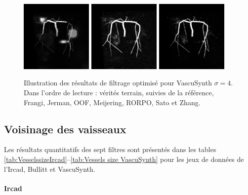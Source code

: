 \begin{figure}[!ht]
  \\
  \includegraphics[clip = true, trim = 80 80 80 80, height=3.5cm]{Images/Vascu_4_RORPO.png}
  \includegraphics[clip = true, trim = 80 80 80 80, height=3.5cm]{Images/Vascu_4_Sato.png}
  \includegraphics[clip = true, trim = 80 80 80 80, height=3.5cm]{Images/Vascu_4_Zhang.png}

  \caption{Illustration des résultats de filtrage optimisé pour VascuSynth $\sigma=4$.
  Dans l'ordre de lecture : vérités terrain, suivies de la référence, Frangi, Jerman, OOF, Meijering, RORPO, Sato et Zhang.}
  \label{fig:qualitative results VascuSynth}
\end{figure}

\subsection{Voisinage des vaisseaux}
Les résultats quantitatifs des sept filtres sont présentés dans les tables \ref{tab:VesselssizeIrcad}--\ref{tab:Vessels size VascuSynth} pour les jeux de données de l'Ircad, Bullitt et VascuSynth.

\paragraph{Ircad}

